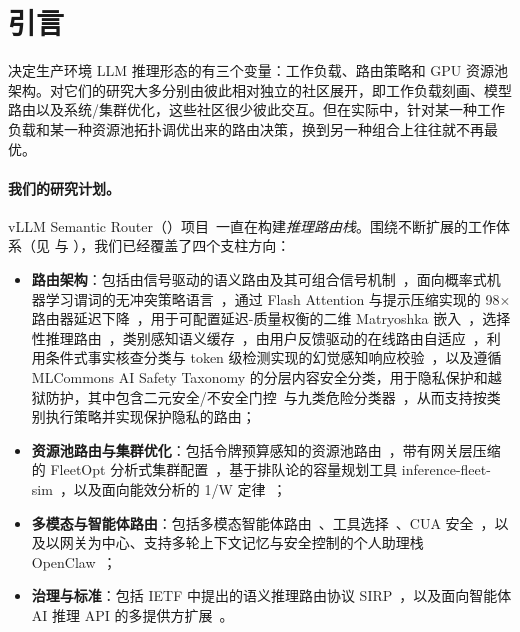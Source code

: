 \section{引言}
\label{sec:intro}

决定生产环境 LLM 推理形态的有三个变量：工作负载、路由策略和 GPU 资源池架构。对它们的研究大多分别由彼此相对独立的社区展开，即工作负载刻画、模型路由以及系统/集群优化，这些社区很少彼此交互。但在实际中，针对某一种工作负载和某一种资源池拓扑调优出来的路由决策，换到另一种组合上往往就不再最优。

\paragraph{我们的研究计划。}
vLLM Semantic Router（\vsr{}）项目~\cite{vllmsr2026}一直在构建\emph{推理路由栈}。围绕不断扩展的工作体系（见  与 ），我们已经覆盖了四个支柱方向：
\begin{itemize}[nosep]
  \item \textbf{路由架构}：包括由信号驱动的语义路由及其可组合信号机制~\cite{vllmsr2026}，面向概率式机器学习谓词的无冲突策略语言~\cite{probpol2026}，通过 Flash Attention 与提示压缩实现的 98$\times$ 路由器延迟下降~\cite{fastrouter2026}，用于可配置延迟-质量权衡的二维 Matryoshka 嵌入~\cite{mmberted2025}，选择性推理路由~\cite{wang2025reason}，类别感知语义缓存~\cite{wang2025cache}，由用户反馈驱动的在线路由自适应~\cite{feedbackdet2026}，利用条件式事实核查分类与 token 级检测实现的幻觉感知响应校验~\cite{halugate2025, factcheck2026}，以及遵循 MLCommons AI Safety Taxonomy 的分层内容安全分类，用于隐私保护和越狱防护，其中包含二元安全/不安全门控~\cite{safetyl1_2026}与九类危险分类器~\cite{safetyl2_2026}，从而支持按类别执行策略并实现保护隐私的路由；
  \item \textbf{资源池路由与集群优化}：包括令牌预算感知的资源池路由~\cite{poolrouting2026}，带有网关层压缩的 FleetOpt 分析式集群配置~\cite{fleetopt2026}，基于排队论的容量规划工具 inference-fleet-sim~\cite{fleetsim2026}，以及面向能效分析的 1/W 定律~\cite{onewlaw2026}；
  \item \textbf{多模态与智能体路由}：包括多模态智能体路由~\cite{avr2026}、工具选择~\cite{oats2026}、CUA 安全~\cite{vcd2026}，以及以网关为中心、支持多轮上下文记忆与安全控制的个人助理栈 OpenClaw~\cite{openclaw2026}；
  \item \textbf{治理与标准}：包括 IETF 中提出的语义推理路由协议 SIRP~\cite{sirp2025}，以及面向智能体 AI 推理 API 的多提供方扩展~\cite{mpext2025}。
\end{itemize}

